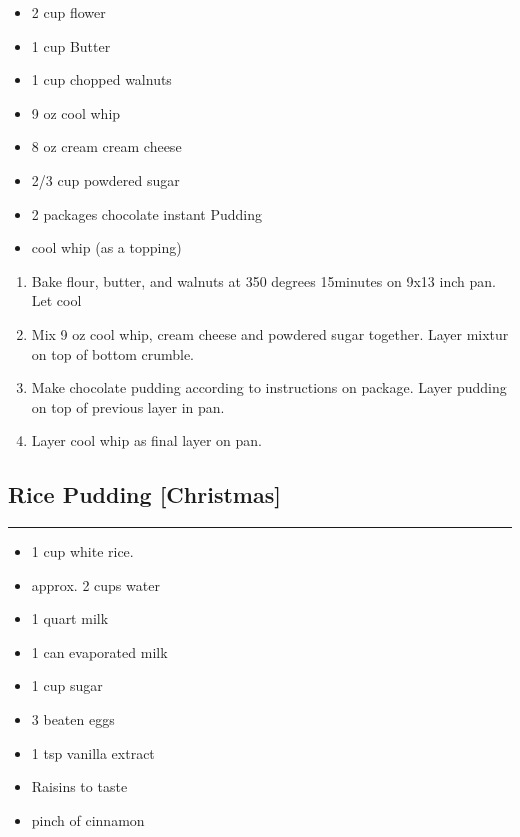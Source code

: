 \documentclass{article}
\begin{document}
\begin{framed}
    \begin{itemize}
        \item 2 cup flower 
        \item 1 cup Butter
        \item 1 cup chopped walnuts
        \item 9 oz cool whip
        \item 8 oz cream cream cheese 
        \item 2/3 cup powdered sugar
        \item 2 packages chocolate instant Pudding
        \item cool whip (as a topping)
    \end{itemize}
\end{framed}

\begin{enumerate}
    \item 
        Bake flour, butter, and walnuts at 350 degrees 15minutes on 9x13 inch pan. Let cool
    \item 
        Mix 9 oz cool whip, cream cheese and powdered sugar together. Layer mixtur on top of bottom crumble.
    \item 
        Make chocolate pudding according to instructions on package. Layer pudding on top of previous layer in pan.
    \item 
        Layer cool whip as final layer on pan. 
\end{enumerate}
\newpage

\subsection{Rice Pudding [Christmas]} 
\noindent\rule[0.5ex]{\linewidth}{1pt}

\begin{framed}
    \begin{itemize}
        \item 1 cup white rice.
        \item approx. 2 cups water
        \item 1 quart milk 
        \item 1 can evaporated milk 
        \item 1 cup sugar 
        \item 3 beaten eggs 
        \item 1 tsp vanilla extract
        \item Raisins to taste
        \item pinch of cinnamon
    \end{itemize}
\end{framed}
\end{document}
